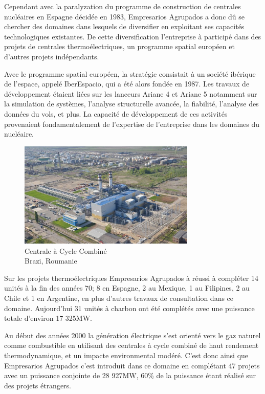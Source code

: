 \documentclass[11pt, openright]{book}
\begin{document}
Cependant avec la paralyzation du programme de construction de centrales nucléaires en Espagne décidée en 1983, Empresarios Agrupados a donc dû se chercher des domaines dans lesquels de diversifier en exploitant ses capacités technologiques existantes. De cette diversification l'entre\-prise à participé dans des projets de centrales thermoélectriques, un programme spatial européen et d'autres projets indépendants.

Avec le programme spatial européen, la stratégie consistait à un société ibérique de l'espace, appelé IberEspacio, qui a été alors fondée en 1987. Les travaux de développement étaient liées sur les lanceurs Ariane 4 et Ariane 5 notamment sur la simulation de systèmes, l'analyse structurelle avancée, la fiabilité, l'analyse des données du vols, et plus. La capacité de développement de ces activités provenaient fondamentalement de l'expertise de l'entreprise dans les domaines du nucléaire.

\begin{figure}
    \vspace{-10pt}
    \includegraphics[width=0.75\textwidth]{./object/Brazi.jpg}
    \caption[caption]{Centrale à Cycle Combiné \\ Brazi, Roumanie\endtabular}
\end{figure}

Sur les projets thermoélectriques Empresarios Agrupados à réussi à compléter 14 unités à la fin des années 70; 8 en Espagne, 2 au Mexique, 1 au Filipines, 2 au Chile et 1 en Argentine, en plus d'autres travaux de consultation dans ce domaine. Aujourd'hui 31 unités à charbon ont été complétés avec une puissance totale d'environ 17 325MW. %

Au début des années 2000 la génération électrique s'est orienté vers le gaz naturel comme combustible en utilisant des centrales à cycle combiné de haut rendement thermodynamique, et un impacte environmental modéré. C'est donc ainsi que Empresarios Agrupados c'est introduit dans ce domaine en complétant 47 projets avec un puissance conjointe de 28 927MW, 60\% de la puissance étant réalisé sur des projets étrangers.
\end{document}
